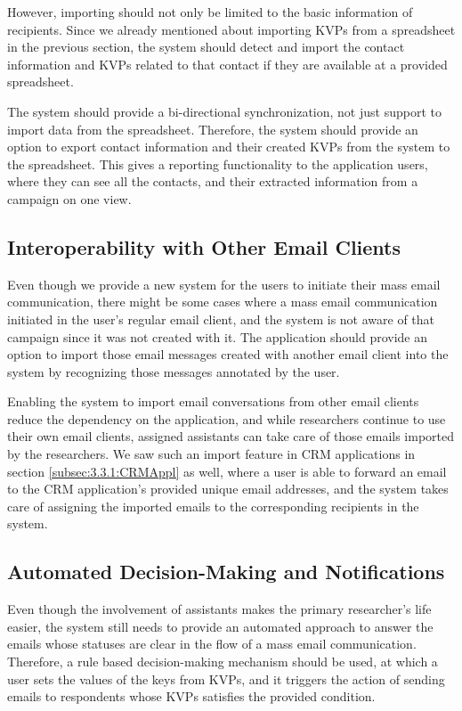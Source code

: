 However, importing should not only be limited to the basic information of recipients. Since we already mentioned about importing \ac{KVP}s from a spreadsheet in the previous section, the system should detect and import the contact information and \ac{KVP}s related to that contact if they are available at a provided spreadsheet. 
\vspace{1cm}

The system should provide a bi-directional synchronization, not just support to import data from the spreadsheet. Therefore, the system should provide an option to export contact information and their created \ac{KVP}s from the system to the spreadsheet. This gives a reporting functionality to the application users, where they can see all the contacts, and their extracted information from a campaign on one view.

\subsection{Interoperability with Other Email Clients}
\label{subsec:5.1.4:InteEmaiClie}
Even though we provide a new system for the users to initiate their mass email communication, there might be some cases where a mass email communication initiated in the user's regular email client, and the system is not aware of that campaign since it was not created with it. The application should provide an option to import those email messages created with another email client into the system by recognizing those messages annotated by the user.
\vspace{1cm}

Enabling the system to import email conversations from other email clients reduce the dependency on the application, and while researchers continue to use their own email clients, assigned assistants can take care of those emails imported by the researchers. We saw such an import feature in \ac{CRM} applications in section \ref{subsec:3.3.1:CRMAppl} as well, where a user is able to forward an email to the \ac{CRM} application's provided unique email addresses, and the system takes care of assigning the imported emails to the corresponding recipients in the system.

\subsection{Automated Decision-Making and Notifications}
\label{subsec:5.1.5:AutoDeciMakiNoti}
Even though the involvement of assistants makes the primary researcher's life easier, the system still needs to provide an automated approach to answer the emails whose statuses are clear in the flow of a mass email communication. Therefore, a rule based decision-making mechanism should be used, at which a user sets the values of the keys from \ac{KVP}s, and it triggers the action of sending emails to respondents whose \ac{KVP}s satisfies the provided condition.
\vspace{1cm}


